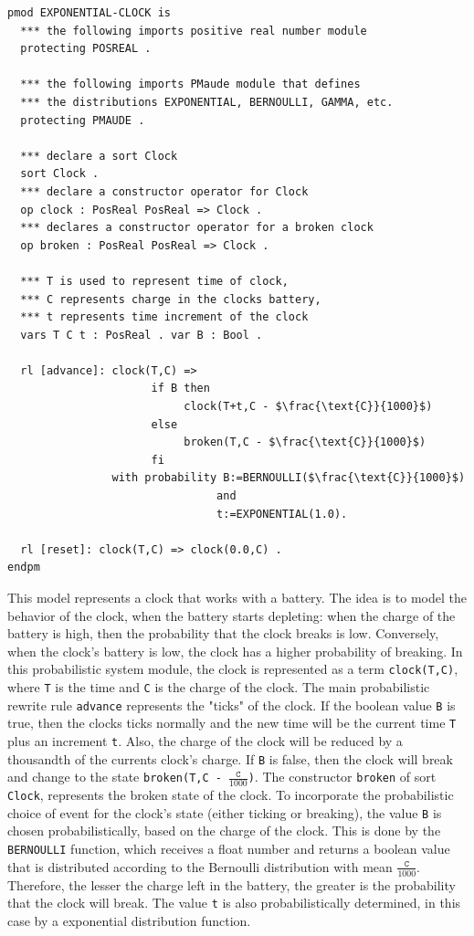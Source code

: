 \begin{lstlisting}[mathescape=true]
pmod EXPONENTIAL-CLOCK is
  *** the following imports positive real number module
  protecting POSREAL .

  *** the following imports PMaude module that defines 
  *** the distributions EXPONENTIAL, BERNOULLI, GAMMA, etc.
  protecting PMAUDE .

  *** declare a sort Clock
  sort Clock .
  *** declare a constructor operator for Clock
  op clock : PosReal PosReal => Clock .
  *** declares a constructor operator for a broken clock
  op broken : PosReal PosReal => Clock .

  *** T is used to represent time of clock,
  *** C represents charge in the clocks battery,
  *** t represents time increment of the clock
  vars T C t : PosReal . var B : Bool .
  
  rl [advance]: clock(T,C) =>
                      if B then
                           clock(T+t,C - $\frac{\text{C}}{1000}$)
                      else
                           broken(T,C - $\frac{\text{C}}{1000}$)
                      fi
                with probability B:=BERNOULLI($\frac{\text{C}}{1000}$) 
                                and 
                                t:=EXPONENTIAL(1.0).
                
  rl [reset]: clock(T,C) => clock(0.0,C) .
endpm
\end{lstlisting}
This model represents a clock that works with a battery. The idea is to model the behavior of the clock, when the battery starts depleting: when the charge of the battery is high, then the probability that the clock breaks is low. Conversely, when the clock's battery is low, the clock has a higher probability of breaking. In this probabilistic system module, the clock is represented as a term \texttt{clock(T,C)}, where \texttt{T} is the time and \texttt{C} is the charge of the clock. The main probabilistic rewrite rule \texttt{advance} represents the "ticks" of the clock. If the boolean value \texttt{B} is true, then the clocks ticks normally and the new time will be the current time \texttt{T} plus an increment \texttt{t}. Also, the charge of the clock will be reduced by a thousandth of the currents clock's charge. If \texttt{B} is false, then the clock will break and change to the state \texttt{broken(T,C - $\frac{\texttt{C}}{1000}$)}. The constructor \texttt{broken} of sort \texttt{Clock}, represents the broken state of the clock. To incorporate the probabilistic choice of event for the clock's state (either ticking or breaking), the value \texttt{B} is chosen probabilistically, based on the charge of the clock. This is done by the \texttt{BERNOULLI} function, which receives a float number and returns a boolean value that is distributed according to the Bernoulli distribution with mean $\frac{\texttt{C}}{1000}$. Therefore, the lesser the charge left in the battery, the greater is the probability that the clock will break. The value \texttt{t} is also probabilistically determined, in this case by a exponential distribution function.
